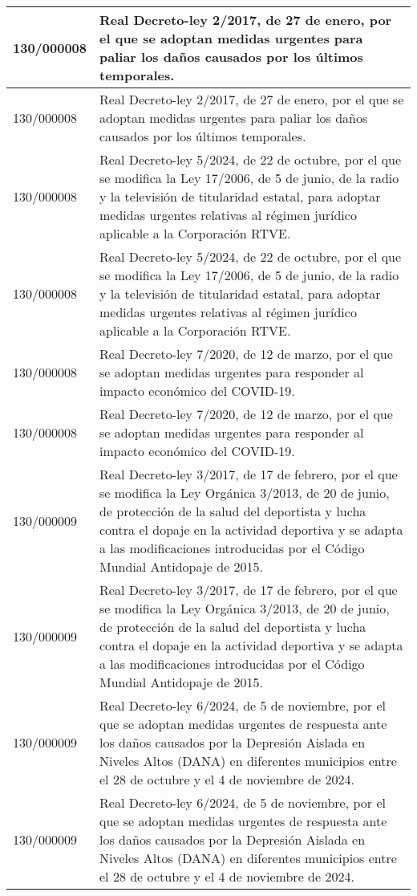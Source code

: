 {\begin{table}[H]
\begin{center}
\begin{tabularx}{\linewidth}{| l | X |}
\hline
130/000008 & Real Decreto-ley 2/2017, de 27 de enero, por el que se adoptan medidas urgentes para paliar los daños causados por los últimos temporales. \\
\hline
130/000008 & Real Decreto-ley 2/2017, de 27 de enero, por el que se adoptan medidas urgentes para paliar los daños causados por los últimos temporales. \\
\hline
130/000008 & Real Decreto-ley 5/2024, de 22 de octubre, por el que se modifica la Ley 17/2006, de 5 de junio, de la radio y la televisión de titularidad estatal, para adoptar medidas urgentes relativas al régimen jurídico aplicable a la Corporación RTVE. \\
\hline
130/000008 & Real Decreto-ley 5/2024, de 22 de octubre, por el que se modifica la Ley 17/2006, de 5 de junio, de la radio y la televisión de titularidad estatal, para adoptar medidas urgentes relativas al régimen jurídico aplicable a la Corporación RTVE. \\
\hline
130/000008 & Real Decreto-ley 7/2020, de 12 de marzo, por el que se adoptan medidas urgentes para responder al impacto económico del COVID-19. \\
\hline
130/000008 & Real Decreto-ley 7/2020, de 12 de marzo, por el que se adoptan medidas urgentes para responder al impacto económico del COVID-19. \\
\hline
130/000009 & Real Decreto-ley 3/2017, de 17 de febrero, por el que se modifica la Ley Orgánica 3/2013, de 20 de junio, de protección de la salud del deportista y lucha contra el dopaje en la actividad deportiva y se adapta a las modificaciones introducidas por el Código Mundial Antidopaje de 2015. \\
\hline
130/000009 & Real Decreto-ley 3/2017, de 17 de febrero, por el que se modifica la Ley Orgánica 3/2013, de 20 de junio, de protección de la salud del deportista y lucha contra el dopaje en la actividad deportiva y se adapta a las modificaciones introducidas por el Código Mundial Antidopaje de 2015. \\
\hline
130/000009 & Real Decreto-ley 6/2024, de 5 de noviembre, por el que se adoptan medidas urgentes de respuesta ante los daños causados por la Depresión Aislada en Niveles Altos (DANA) en diferentes municipios entre el 28 de octubre y el 4 de noviembre de 2024. \\
\hline
130/000009 & Real Decreto-ley 6/2024, de 5 de noviembre, por el que se adoptan medidas urgentes de respuesta ante los daños causados por la Depresión Aislada en Niveles Altos (DANA) en diferentes municipios entre el 28 de octubre y el 4 de noviembre de 2024. \\

\end{tabularx}
\end{center}
\end{table}}

